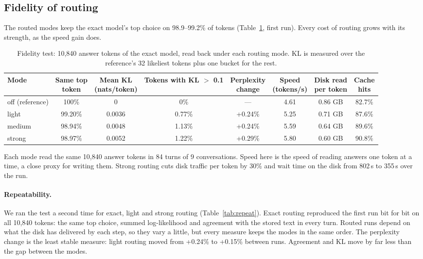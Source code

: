 \subsection{Fidelity of routing}\label{sec:fidelity}
The routed modes keep the exact model's top choice on 98.9--99.2\% of tokens (Table~\ref{tab:fidelity}, first run). Every cost of routing grows with its strength, as the speed gain does.

\begin{table}[t]
\centering\small
\caption{Fidelity test: 10,840 answer tokens of the exact model, read back under each routing mode. KL is measured over the reference's 32 likeliest tokens plus one bucket for the rest.}
\label{tab:fidelity}
\setlength{\tabcolsep}{4pt}
\begin{tabular}{lccccccc}
\toprule
Mode & \makecell{Same top\\token} & \makecell{Mean KL\\(nats/token)} & \makecell{Tokens with\\KL $>$ 0.1} & \makecell{Perplexity\\change} & \makecell{Speed\\(tokens/s)} & \makecell{Disk read\\per token} & \makecell{Cache\\hits} \\
\midrule
off (reference) & 100\% & 0 & 0\% & --- & 4.61 & 0.86 GB & 82.7\% \\
light & 99.20\% & 0.0036 & 0.77\% & +0.24\% & 5.25 & 0.71 GB & 87.6\% \\
medium & 98.94\% & 0.0048 & 1.13\% & +0.24\% & 5.59 & 0.64 GB & 89.6\% \\
strong & 98.97\% & 0.0052 & 1.22\% & +0.29\% & 5.80 & 0.60 GB & 90.8\% \\
\bottomrule
\end{tabular}
\end{table}

Each mode read the same 10,840 answer tokens in 84 turns of 9 conversations. Speed here is the speed of reading answers one token at a time, a close proxy for writing them. Strong routing cuts disk traffic per token by 30\% and wait time on the disk from 802\,s to 355\,s over the run.

\paragraph{Repeatability.} We ran the test a second time for exact, light and strong routing (Table~\ref{tab:repeat}). Exact routing reproduced the first run bit for bit on all 10,840 tokens: the same top choice, summed log-likelihood and agreement with the stored text in every turn. Routed runs depend on what the disk has delivered by each step, so they vary a little, but every measure keeps the modes in the same order. The perplexity change is the least stable measure: light routing moved from +0.24\% to +0.15\% between runs. Agreement and KL move by far less than the gap between the modes.

